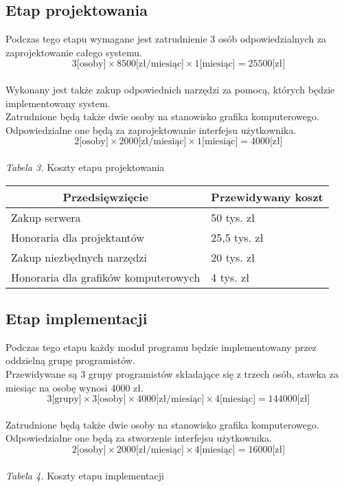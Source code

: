 \documentclass [11pt, a4paper, leqno]	{article}	%
\begin{document}
\subsection{Etap projektowania}
\noindent
Podczas tego etapu wymagane jest zatrudnienie 3 osób odpowiedzialnych za zaprojektowanie całego systemu. \\
\begin{equation}3 \text{[osoby]} \times  8500 \text{[zł/miesiąc]} \times 1 \text{[miesiąc]} = 25500 \text{[zł]} \end{equation} \\
Wykonany jest także zakup odpowiednich narzędzi za pomocą, których będzie implementowany system.  \\
Zatrudnione będą także dwie osoby na stanowisko grafika komputerowego. Odpowiedzialne one będą za zaprojektowanie interfejsu użytkownika. \\
\begin{equation}2 \text{[osoby]} \times 2000 \text{[zł/miesiąc]} \times 1 \text{[miesiąc]} = 4000 \text{[zł]} \end{equation} \\
\textit{Tabela 3.} Koszty etapu projektowania

\begin{center}
	\begin{tabular}{| l | l |}
		\hline
		\multicolumn{1}{|c|}{Przedsięwzięcie} & 
		\multicolumn{1}{|c|}{Przewidywany koszt} \\ \hline \hline
		Zakup serwera & 50 tys. zł \\ \hline
		Honoraria dla projektantów & 25,5 tys. zł \\ \hline
		Zakup niezbędnych narzędzi & 20 tys. zł \\ \hline
		Honoraria dla grafików komputerowych & 4 tys. zł \\ \hline
	\end{tabular}
\end{center}

\subsection{Etap implementacji}
\noindent
Podczas tego etapu każdy moduł programu będzie implementowany przez oddzielną grupę programistów. \\
Przewidywane są 3 grupy programistów składające się z trzech osób, stawka za miesiąc na osobę wynosi 4000 zł. \\
\begin{equation}3 \text{[grupy]} \times 3 \text{[osoby]} \times 4000 \text{[zł/miesiąc]} \times  4 \text{[miesiąc]} = 144000 \text{[zł]} \end{equation} \\
Zatrudnione będą także dwie osoby na stanowisko grafika komputerowego. Odpowiedzialne one będą za stworzenie interfejsu użytkownika. \\
\begin{equation}2 \text{[osoby]} \times 2000 \text{[zł/miesiąc]} \times 4 \text{[miesiąc]} = 16000 \text{[zł]} \end{equation} \\
\textit{Tabela 4.} Koszty etapu implementacji
\end{document}
